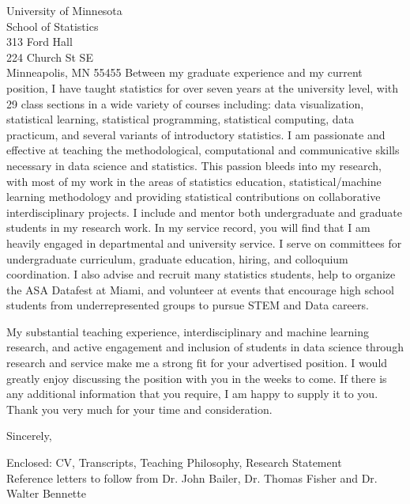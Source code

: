 \documentclass[11pt]{letter}\usepackage[]{graphicx}\usepackage[]{color}
\begin{document}
\begin{letter}{University of Minnesota\\
School of Statistics\\
313 Ford Hall\\
224 Church St SE\\
Minneapolis, MN 55455
}
Between my graduate experience and my current position, I have taught statistics for over seven years at the university level, with 29 class sections in a wide variety of courses including: data visualization, statistical learning, statistical programming, statistical computing, data practicum, and several variants of introductory statistics. I am passionate and effective at teaching the methodological, computational and communicative skills necessary in data science and statistics. This passion bleeds into my research, with most of my work in the areas of statistics education, statistical/machine learning methodology and providing statistical contributions on collaborative interdisciplinary projects. I include and mentor both undergraduate and graduate students in my research work. In my service record, you will find that I am heavily engaged in departmental and university service. I serve on committees for undergraduate curriculum, graduate education, hiring, and colloquium coordination. I also advise and recruit many statistics students, help to organize the ASA Datafest at Miami, and volunteer at events that encourage high school students from underrepresented groups to pursue STEM and Data careers. 


My substantial teaching experience, interdisciplinary and machine learning research, and active engagement and inclusion of students in data science through research and service make me a strong fit for your advertised position. I would greatly enjoy discussing the position with you in the weeks to come. If there is any additional information that you require, I am happy to supply it to you. Thank you very much for your time and consideration.

\addtolength{\medskipamount}{-1\medskipamount}
\closing{Sincerely,}


Enclosed: CV, Transcripts, Teaching Philosophy, Research Statement\\
Reference letters to follow from Dr. John Bailer, Dr. Thomas Fisher and Dr. Walter Bennette


\end{letter}
\end{document}

